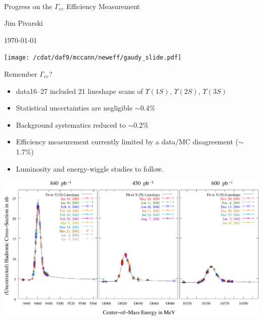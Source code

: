 \documentclass[landscape]{article}
\begin{document}
\huge
\renewcommand{\labelitemi}{-}
\setlength{\parindent}{0 cm}

\mbox{ }

\vfill
\begin{minipage}{\linewidth}
\begin{center}
{\Huge Progress on the $\Gamma_{ee}$ Efficiency Measurement}

\vspace{1.5 cm}
Jim Pivarski

\vspace{1.5 cm}
\today
\end{center}
\end{minipage}
\vfill
\pagebreak

\begin{center}
  \texttt{[image: /cdat/daf9/mccann/neweff/gaudy\_slide.pdf]}
\end{center}

{\Huge Remember $\Gamma_{ee}$?}

\begin{itemize}

  \item data16--27 included 21 lineshape scans of $\Upsilon(1S)$, $\Upsilon(2S)$, $\Upsilon(3S)$

  \item Statistical uncertainties are negligible $\sim$0.4\%

  \item Background systematics reduced to $\sim$0.2\%

  \item Efficiency measurement currently limited by a data/MC disagreement ($\sim$1.7\%)

  \item Luminosity and energy-wiggle studies to follow.

\end{itemize}
\vfill
\begin{center}
  \includegraphics[width=0.9\linewidth]{p2gg_three_peaks.pdf}
\end{center}
\end{document}
